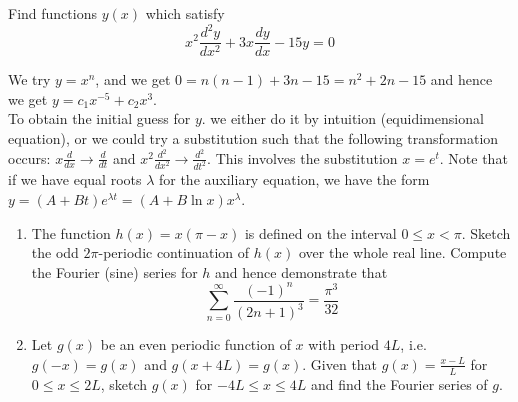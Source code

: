 \documentclass[a4paper]{article}
\begin{document}
\begin{qns}
Find functions $y(x)$ which satisfy
$$x^2\frac{d^2y}{dx^2}+3x\frac{dy}{dx}-15y=0$$
\end{qns}
\begin{ans}
We try $y=x^n$, and we get $0=n(n-1)+3n-15=n^2+2n-15$ and hence we get $y=c_1x^{-5}+c_2x^3$.\\[5pt]
To obtain the initial guess for $y$. we either do it by intuition (equidimensional equation), or we could try a substitution such that the following transformation occurs: $x\frac{d}{dx}\rightarrow\frac{d}{dt}$ and $x^2\frac{d^2}{dx^2}\rightarrow\frac{d^2}{dt^2}$. This involves the substitution $x=e^t$. Note that if we have equal roots $\lambda$ for the auxiliary equation, we have the form $y=(A+Bt)e^{\lambda t}=(A+B\ln x)x^\lambda$.
\end{ans}
\newpage
\begin{qns}\leavevmode
\begin{enumerate}[label=(\alph*)]
\item  The function $h(x) = x(\pi -x)$ is defined on the interval $0\leq x<\pi$. Sketch the odd $2\pi$-periodic continuation of $h(x)$ over the whole real line. Compute the Fourier (sine) series for $h$ and hence demonstrate that
$$\sum_{n=0}^\infty\frac{(-1)^n}{(2n+1)^3}=\frac{\pi^3}{32}$$
\item  Let $g(x)$ be an even periodic function of $x$ with period $4L$, i.e. $g(-x)=g(x)$ and $g(x+4L)=g(x)$. Given that $g(x)=\frac{x-L}{L}$ for $0\leq x\leq 2L$, sketch $g(x)$ for $-4L\leq x\leq 4L$ and find the Fourier series of $g$.
\end{enumerate}
\end{qns}
\end{document}
